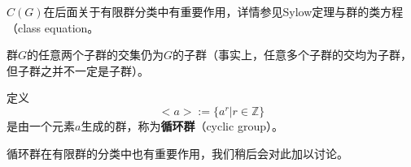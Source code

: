 \begin{note}
	$C(G)$在后面关于有限群分类中有重要作用，详情参见Sylow定理与群的类方程（class equation。
\end{note}
\begin{theorem}
	群$G$的任意两个子群的交集仍为$G$的子群（事实上，任意多个子群的交均为子群，但子群之并不一定是子群）。
\end{theorem}
\begin{definition}\label{cyclic group}
	定义
	\begin{equation}
		<a> :=\{a^r| r\in \mathbb Z\}
	\end{equation}
	是由一个元素$a$生成的群，称为\textbf{循环群}（cyclic group）。
\end{definition}
\begin{note}
	循环群在有限群的分类中也有重要作用，我们稍后会对此加以讨论。
\end{note}
